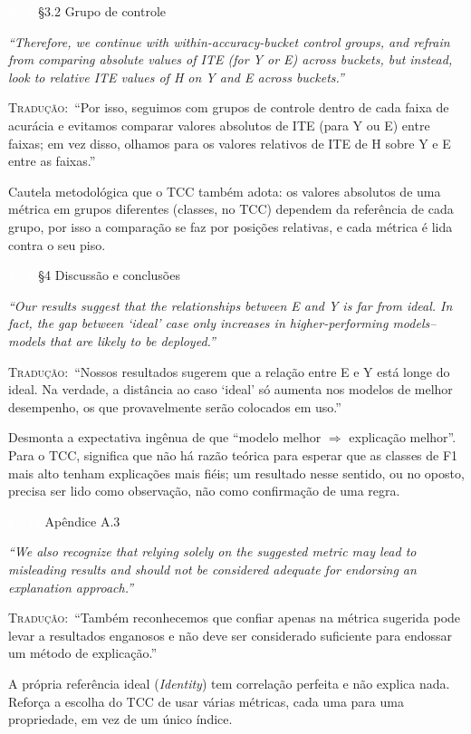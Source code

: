 \documentclass[11pt,a4paper]{article}
\newcommand{\pagechip}[1]{{\setlength{\fboxsep}{1.5pt}\colorbox{cAcc}{\textcolor{white}{\scriptsize\texttt{#1}}}}}
\newenvironment{origquote}{\par\itshape\small}{\par}
\newenvironment{tradquote}{\par\small\textsc{Tradução:}\ }{\par}
\newcommand{\explab}[1]{\par\smallskip{\small\color{cAcc}\textbf{\MakeUppercase{#1}}}\par}
\begin{document}
\begin{citacard}{\pagechip{p. 6} §3.2 Grupo de controle}
\begin{origquote}“Therefore, we continue with within-accuracy-bucket control groups, and refrain from comparing absolute values of ITE (for Y or E) across buckets, but instead, look to relative ITE values of H on Y and E across buckets.”\end{origquote}
\begin{tradquote}“Por isso, seguimos com grupos de controle dentro de cada faixa de acurácia e evitamos comparar valores absolutos de ITE (para Y ou E) entre faixas; em vez disso, olhamos para os valores relativos de ITE de H sobre Y e E entre as faixas.”\end{tradquote}
\explab{Explicação}
Cautela metodológica que o TCC também adota: os valores absolutos de uma métrica em grupos diferentes (classes, no TCC) dependem da referência de cada grupo, por isso a comparação se faz por posições relativas, e cada métrica é lida contra o seu piso.
\end{citacard}

\begin{citacard}{\pagechip{p. 8} §4 Discussão e conclusões}
\begin{origquote}“Our results suggest that the relationships between E and Y is far from ideal. In fact, the gap between ‘ideal’ case only increases in higher-performing models–models that are likely to be deployed.”\end{origquote}
\begin{tradquote}“Nossos resultados sugerem que a relação entre E e Y está longe do ideal. Na verdade, a distância ao caso ‘ideal’ só aumenta nos modelos de melhor desempenho, os que provavelmente serão colocados em uso.”\end{tradquote}
\explab{Explicação}
Desmonta a expectativa ingênua de que “modelo melhor $\Rightarrow$ explicação melhor”. Para o TCC, significa que não há razão teórica para esperar que as classes de F1 mais alto tenham explicações mais fiéis; um resultado nesse sentido, ou no oposto, precisa ser lido como observação, não como confirmação de uma regra.
\end{citacard}

\begin{citacard}{\pagechip{p. 13} Apêndice A.3}
\begin{origquote}“We also recognize that relying solely on the suggested metric may lead to misleading results and should not be considered adequate for endorsing an explanation approach.”\end{origquote}
\begin{tradquote}“Também reconhecemos que confiar apenas na métrica sugerida pode levar a resultados enganosos e não deve ser considerado suficiente para endossar um método de explicação.”\end{tradquote}
\explab{Explicação}
A própria referência ideal (\textit{Identity}) tem correlação perfeita e não explica nada. Reforça a escolha do TCC de usar várias métricas, cada uma para uma propriedade, em vez de um único índice.
\end{citacard}
\end{document}
